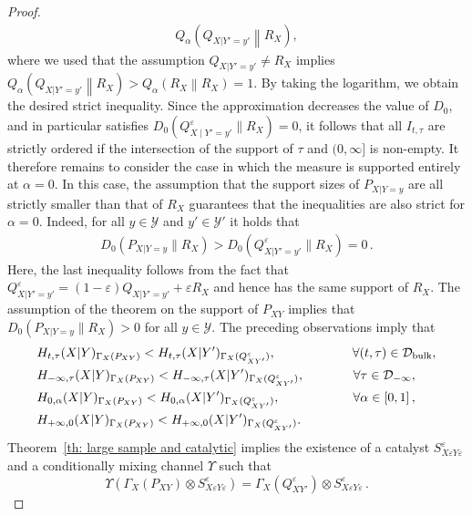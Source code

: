 \documentclass[aps,pra,11pt,onecolumn,nofootinbib,tightenlines]{revtex4-2}
\theoremstyle{definition}
\newcommand{\D}{\mathcal{D}}
\newcommand{\Y}{\mathcal{Y}}
\newcommand{\mc}[1]{\mathcal{#1}}
\begin{document}
\begin{proof}
\begin{align}
    Q_\alpha\!\left(Q_{X|Y'=y'} \middle\| R_X \right) ,
\end{align}
where we used that the assumption $Q_{X|Y'=y'}\neq R_X$ implies $Q_\alpha\!\left(Q_{X|Y'=y'} \middle\| R_X \right)
>
Q_\alpha\!\left(R_X \middle\| R_X \right)
=1$.
By taking the logarithm, we obtain the desired strict inequality. Since the approximation decreases the value of $D_0$, and in particular satisfies $D_0(Q^{\varepsilon}_{X\mid Y'=y'} \| R_X)=0$, it follows that all $I_{t,\tau}$ are strictly ordered if the intersection of the support of $\tau$ and $(0,\infty]$ is non-empty. It therefore remains to consider the case in which the measure is supported entirely at $\alpha=0$.
In this case, the assumption that the support sizes of $P_{X|Y=y}$ are all strictly smaller than that of $R_X$ guarantees that the inequalities are also strict for $\alpha=0$. Indeed, for all $y\in\mc Y$ and $y'\in\mc Y'$ it holds that
 \begin{align}
     D_0 (P_{X|Y=y} \| R_X) >D_0(Q^\varepsilon_{X|Y'=y'} \| R_X )  = 0 \,.
\end{align}
Here, the last inequality follows from the fact that $Q^\varepsilon_{X|Y'=y'} = (1-\varepsilon )Q_{X|Y'=y'} + \varepsilon R_X$ and hence has the same support of $R_X$. The assumption of the theorem on the support of $P_{XY}$ implies that $D_0(P_{X|Y=y}\|R_X)> 0$ for all $y\in \Y$.
 The preceding observations imply that
\begin{align}
    & H_{t,\tau}(X|Y)_{\Gamma_X(P_{XY})} < H_{t,\tau}(X|Y')_{\Gamma_X(Q^\varepsilon_{XY'})}, \qquad\qquad\qquad \forall (t,\tau) \in \D_{\rm{bulk}}, \\
    &H_{-\infty,\tau}(X|Y)_{\Gamma_X(P_{XY})} < H_{-\infty,\tau}(X|Y')_{\Gamma_X(Q^\varepsilon_{XY'})}, \quad\quad \quad  \;\;\; \forall \tau \in \D_{-\infty}, \\
    &H_{0,\alpha}(X|Y)_{\Gamma_X(P_{XY})} < H_{0,\alpha}(X|Y')_{\Gamma_X(Q^\varepsilon_{XY'})}, \quad\,\qquad \quad\quad\;\; \forall \alpha \in [0,1] \,,\\
    &H_{+\infty,0}(X|Y)_{\Gamma_X(P_{XY})} < H_{+\infty,0}(X|Y')_{\Gamma_X(Q^\varepsilon_{XY'})}.
\end{align}
Theorem~\ref{th: large sample and catalytic} implies the existence of a catalyst $S^\varepsilon_{X\varepsilon Y\varepsilon}$ and a conditionally mixing channel $\Upsilon$ such that
\begin{equation}
    \Upsilon(\Gamma_X (P_{XY}) \otimes S^\varepsilon_{X\varepsilon Y\varepsilon})= \Gamma_X (Q^\varepsilon_{XY'}) \otimes S^\varepsilon_{X\varepsilon Y\varepsilon} \,.

\end{equation}
\end{proof}
\end{document}
